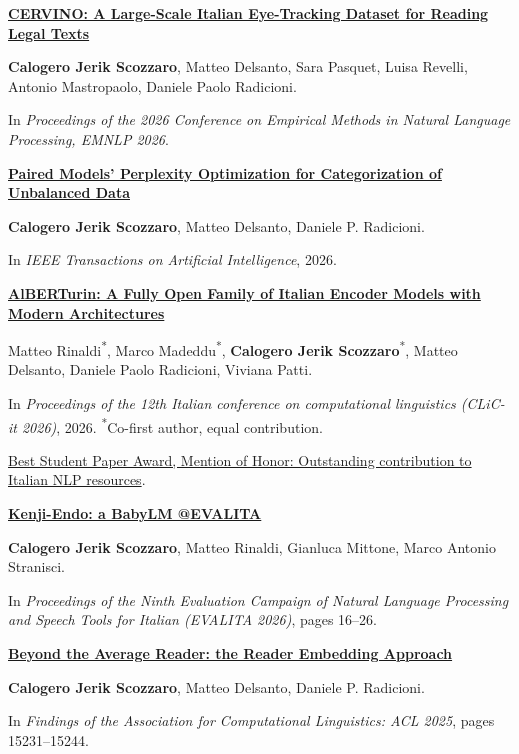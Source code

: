 \documentclass[10pt,a4paper]{article}
\newcommand{\cvsection}[1]{\par\vspace{14pt}{\large\bfseries #1}\par\vspace{4pt}{\color{rulecolor}\hrule}\vspace{8pt}}
\newcommand{\paper}[4]{\par\textbf{\href{#1}{#2}}\par{\small #3}\par{\small\color{muted}#4}\par\vspace{9pt}}
\newcommand{\self}{\textbf{Calogero Jerik Scozzaro}}
\begin{document}
\cvsection{Selected publications}
\paper{https://doi.org/10.5281/zenodo.22082820}{CERVINO: A Large-Scale Italian Eye-Tracking Dataset for Reading Legal Texts}{\self, Matteo Delsanto, Sara Pasquet, Luisa Revelli, Antonio Mastropaolo, Daniele Paolo Radicioni.}{In \textit{Proceedings of the 2026 Conference on Empirical Methods in Natural Language Processing, EMNLP 2026}.}
\paper{https://doi.org/10.1109/TAI.2026.3730663}{Paired Models' Perplexity Optimization for Categorization of Unbalanced Data}{\self, Matteo Delsanto, Daniele P. Radicioni.}{In \textit{IEEE Transactions on Artificial Intelligence}, 2026.}
\paper{https://huggingface.co/AlBERTurin}{AlBERTurin: A Fully Open Family of Italian Encoder Models with Modern Architectures}{Matteo Rinaldi\textsuperscript{*}, Marco Madeddu\textsuperscript{*}, \self\textsuperscript{*}, Matteo Delsanto, Daniele Paolo Radicioni, Viviana Patti.}{In \textit{Proceedings of the 12th Italian conference on computational linguistics (CLiC-it 2026)}, 2026. \textsuperscript{*}Co-first author, equal contribution.\par
\href{https://clic2026.unipa.it/awards/}{Best Student Paper Award, Mention of Honor: Outstanding contribution to Italian NLP resources}.}
\paper{https://aclanthology.org/2026.evalita-1.4/}{Kenji-Endo: a BabyLM @EVALITA}{\self, Matteo Rinaldi, Gianluca Mittone, Marco Antonio Stranisci.}{In \textit{Proceedings of the Ninth Evaluation Campaign of Natural Language Processing and Speech Tools for Italian (EVALITA 2026)}, pages 16–26.}
\paper{https://aclanthology.org/2025.findings-acl.789/}{Beyond the Average Reader: the Reader Embedding Approach}{\self, Matteo Delsanto, Daniele P. Radicioni.}{In \textit{Findings of the Association for Computational Linguistics: ACL 2025}, pages 15231–15244.}
\end{document}
